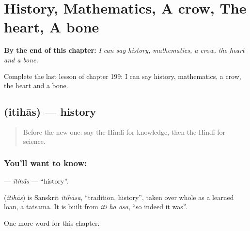 
\chapter{History, Mathematics, A crow, The heart, A bone}
\label{ch:hi-history-mathematics-a-crow-the-heart-a-bone}

\begin{chapteropening}
\textbf{By the end of this chapter:} \emph{I can say history, mathematics, a crow, the heart and a bone.}

Complete the last lesson of chapter 199: I can say history, mathematics, a crow, the heart and a bone.
\end{chapteropening}

\section[\texorpdfstring{\hi{इतिहास} (itihās)}{इतिहास (itihās)}]{ (itihās) — history}

\label{lesson:HI-C199-itihas}



\begin{quote}
Before the new one: say the Hindi for knowledge, then the Hindi for science.
\end{quote}

\subsection*{You'll want to know: }
\textbf{} — \emph{itihās} — \textquotedblleft{}history\textquotedblright{}.

\begin{cousinweb}
\textbf{} (\emph{itihās}) is Sanskrit \emph{itihāsa}, \textquotedblleft{}tradition, history\textquotedblright{}, taken over whole as a learned loan, a tatsama. It is built from \emph{iti ha āsa}, \textquotedblleft{}so indeed it was\textquotedblright{}.
\end{cousinweb}

\begin{grammarlens}[title={What you've built}]
One more word for this chapter.
\end{grammarlens}


